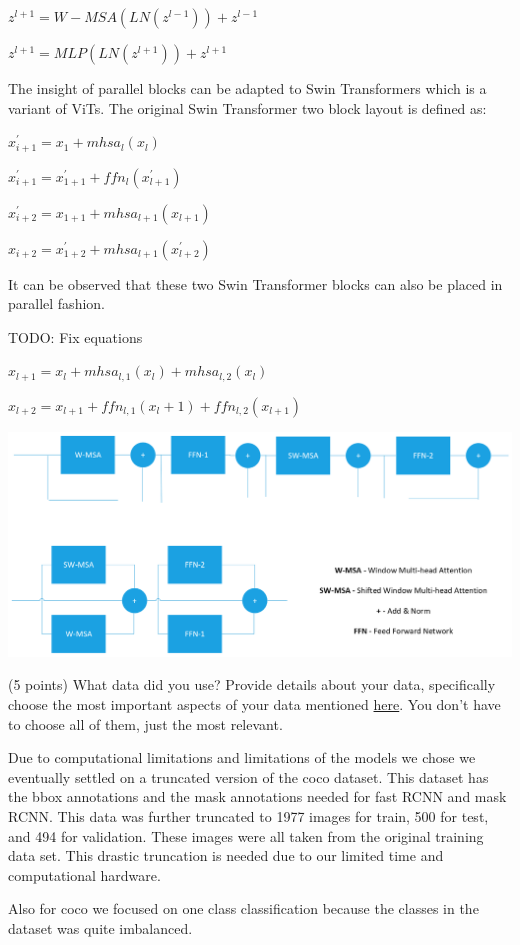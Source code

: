 \documentclass[10pt,twocolumn,letterpaper]{article}
\begin{document}
$z^{l+1} = W-MSA (LN(z^{l-1})) + z^{l-1}$

$z^{l+1} = MLP (LN(z^{l+1})) + z^{l+1}$

The insight of parallel blocks can be adapted to Swin Transformers\cite{liu2021swin} which is a variant of ViTs. The original Swin Transformer two block layout is defined as:

$x^{'}_{i+1} = x_1 + mhsa_l(x_l)$

$x^{'}_{i+1} = x^{'}_{1+1} + ffn_l(x^{'}_{l+1})$

$x^{'}_{i+2} = x_{1+1} + mhsa_{l+1}(x_{l+1})$

$x_{i+2} = x^{'}_{1+2} + mhsa_{l+1}(x^{'}_{l+2})$

It can be observed that these two Swin Transformer blocks can also be placed in parallel fashion.

TODO: Fix equations

$x_{l+1} = x_{l} + mhsa_{l,1}(x_l) + mhsa_{l,2}(x_l)$

$x_{l+2} = x_{l+1} + ffn_{l,1}(x_l+1) + ffn_{l,2}(x_{l+1})$

\includegraphics[width=0.8\linewidth]{docs/latex/images/MSA-Swin.png}
\caption{}

(5 points) What data did you use? Provide details about your data, specifically choose the most important aspects of your data mentioned \href{https://arxiv.org/abs/1803.09010}{here}. You don’t have to choose all of them, just the most relevant.

Due to computational limitations and limitations of the models we chose we eventually settled on a truncated version of the coco dataset. This dataset has the bbox annotations and the mask annotations needed for fast RCNN and mask RCNN. This data was further truncated to 1977 images for train, 500 for test, and 494 for validation. These images were all taken from the original training data set. This drastic truncation is needed due to our limited time and computational hardware.  

Also for coco we focused on one class classification because the classes in the dataset was quite imbalanced. 
\end{document}
